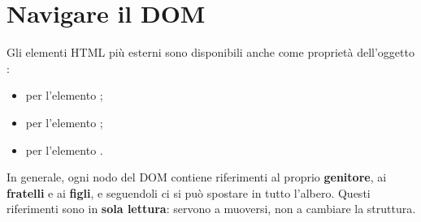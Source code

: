 
\section{Navigare il DOM}

Gli elementi HTML più esterni sono disponibili anche come proprietà
dell'oggetto :

\begin{itemize}
  \item {} per l'elemento ;
  \item {} per l'elemento ;
  \item {} per l'elemento .
\end{itemize}

In generale, ogni nodo del DOM contiene riferimenti al proprio
\textbf{genitore}, ai \textbf{fratelli} e ai \textbf{figli}, e seguendoli ci si
può spostare in tutto l'albero. Questi riferimenti sono in \textbf{sola
lettura}: servono a muoversi, non a cambiare la struttura.

